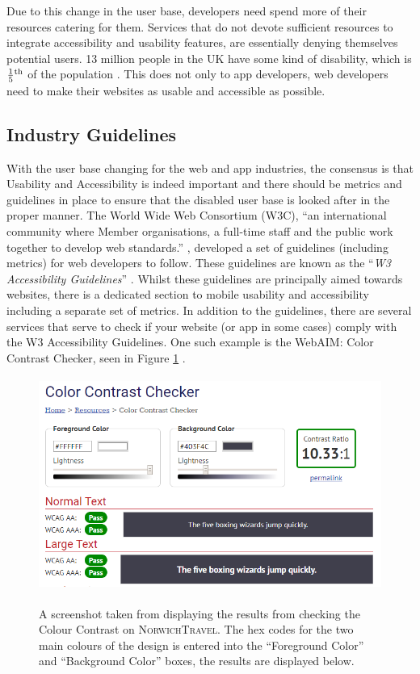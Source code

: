 \documentclass[cmpstyle]{ueacmpstyle}
\newcommand{\nt}{\textsc{NorwichTravel}}
\begin{document}
		Due to this change in the user base, developers need spend more of their resources catering for them. Services that do not devote sufficient resources to integrate accessibility and usability features, are essentially denying themselves potential users. 13 million people in the UK have some kind of disability, which is $\frac{1}{5}\textsuperscript{th}$ of the population \citep{disabledUK}. This does not only to app developers, web developers need to make their websites as usable and accessible as possible.
		
		\subsection{Industry Guidelines} \label{industry}
		With the user base changing for the web and app industries, the consensus is that Usability and Accessibility is indeed important and there should be metrics and guidelines in place to ensure that the disabled user base is looked after in the proper manner. The World Wide Web Consortium (W3C), ``an international community where Member organisations, a full-time staff and the public work together to develop web standards.'' \citep{W3Cwho}, developed a set of guidelines (including metrics) for web developers to follow. These guidelines are known as the ``\textit{W3 Accessibility Guidelines}'' \citep{w3guide}. Whilst these guidelines are principally aimed towards websites, there is a dedicated section to mobile usability and accessibility including a separate set of metrics. In addition to the guidelines, there are several services that serve to check if your website (or app in some cases) comply with the W3 Accessibility Guidelines. One such example is the WebAIM: Color Contrast Checker, seen in Figure \ref{fig:contrast-check} \citep{contrast-check}.
		
		\begin{figure}
			\centering
			\includegraphics[height=7cm]{images/contrast-checker.png}\\
			\caption{A screenshot taken from \citep{contrast-check} displaying the results from checking the Colour Contrast on \nt. The hex codes for the two main colours of the design is entered into the ``Foreground Color'' and ``Background Color'' boxes, the results are displayed below.}\label{fig:contrast-check}
		\end{figure}
		
\end{document}
